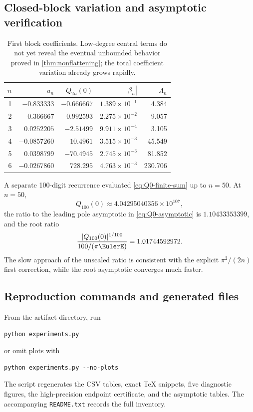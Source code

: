 \documentclass[11pt]{article}
\theoremstyle{definition}
\theoremstyle{remark}
\begin{document}
\subsection{Closed-block variation and asymptotic verification}

\begin{table}[H]
\centering
\small
\begin{tabular}{@{}rrrrr@{}}
\toprule
$n$ & $u_n$ & $Q_{2n}(0)$ & $|\beta_n|$ & $\Lambda_n$ \\
\midrule
1 & $-0.833333$ & $-0.666667$ & $1.389\times10^{-1}$ & 4.384 \\
2 & $0.366667$  & $0.992593$  & $2.275\times10^{-2}$ & 9.057 \\
3 & $0.0252205$ & $-2.51499$  & $9.911\times10^{-4}$ & 3.105 \\
4 & $-0.0857260$& $10.4961$   & $3.515\times10^{-3}$ & 45.549 \\
5 & $0.0398799$ & $-70.4945$  & $2.745\times10^{-3}$ & 81.852 \\
6 & $-0.0267860$& $728.295$   & $4.763\times10^{-3}$ & 230.706 \\
\bottomrule
\end{tabular}
\caption{First block coefficients.  Low-degree central terms do not yet reveal
the eventual unbounded behavior proved in \cref{thm:nonflattening}; the total
coefficient variation already grows rapidly.}
\label{tab:block-data}
\end{table}

A separate 100-digit recurrence evaluated \eqref{eq:Q0-finite-sum} up to
$n=50$.  At $n=50$,
\[
 Q_{100}(0)\approx4.04295040356\times10^{107},
\]
the ratio to the leading pole asymptotic in \eqref{eq:Q0-asymptotic} is
$1.10433353399$, and the root ratio
\[
 \frac{|Q_{100}(0)|^{1/100}}{100/(\pi\EulerE)}
 =1.01744592972.
\]
The slow approach of the unscaled ratio is consistent with the explicit
$\pi^2/(2n)$ first correction, while the root asymptotic converges much faster.

\subsection{Reproduction commands and generated files}

From the artifact directory, run
\begin{lstlisting}[style=pythonstyle]
python experiments.py
\end{lstlisting}
or omit plots with
\begin{lstlisting}[style=pythonstyle]
python experiments.py --no-plots
\end{lstlisting}
The script regenerates the CSV tables, exact TeX snippets, five diagnostic
figures, the high-precision endpoint certificate, and the asymptotic tables.
The accompanying \texttt{README.txt} records the full inventory.
\end{document}
